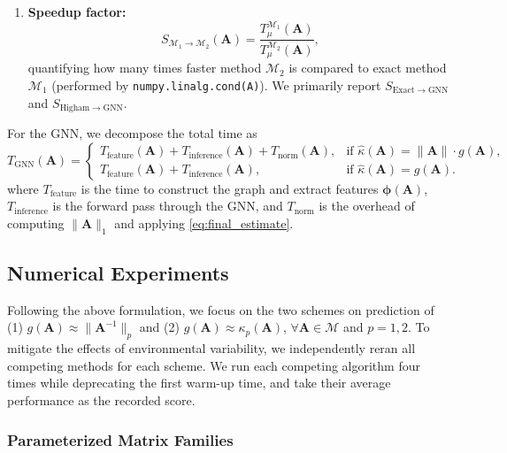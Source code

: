 \documentclass[11pt,a4paper]{article}
\theoremstyle{plain}
\theoremstyle{definition}
\theoremstyle{remark}
\begin{document}
\begin{itemize}
\begin{enumerate}
\item \textbf{Speedup factor:}
\begin{equation}
S_{\mathcal{M}_1 \to \mathcal{M}_2}(\mathbf{A}) = \frac{T_{\mu}^{\mathcal{M}_1}(\mathbf{A})}{T_{\mu}^{\mathcal{M}_2}(\mathbf{A})},
\label{eq:speedup}
\end{equation}
quantifying how many times faster method $\mathcal{M}_2$ is compared to exact method $\mathcal{M}_1$ (performed by \texttt{numpy.linalg.cond(A)}). We primarily report $S_{\mathrm{Exact} \to \mathrm{GNN}}$ and $S_{\mathrm{Higham} \to \mathrm{GNN}}$. 
\end{enumerate}

For the GNN, we decompose the total time as
\begin{equation*}
T_{\mathrm{GNN}}(\mathbf{A}) =
\begin{cases}
T_{\mathrm{feature}}(\mathbf{A}) + T_{\mathrm{inference}}(\mathbf{A}) + T_{\mathrm{norm}}(\mathbf{A}), & \text{if } \hat{\kappa}(\mathbf{A}) = \|\mathbf{A}\| \cdot g(\mathbf{A}), \\
T_{\mathrm{feature}}(\mathbf{A}) + T_{\mathrm{inference}}(\mathbf{A}), & \text{if } \hat{\kappa}(\mathbf{A}) = g(\mathbf{A}).
\end{cases}
\end{equation*}
where $T_{\mathrm{feature}}$ is the time to construct the graph and extract features $\bm{\phi}(\mathbf{A})$, $T_{\mathrm{inference}}$ is the forward pass through the GNN, and $T_{\mathrm{norm}}$ is the overhead of computing $\|\mathbf{A}\|_1$ and applying \eqref{eq:final_estimate}. 
\end{itemize}



\subsection{Numerical Experiments}

Following the above formulation, we focus on the two schemes on prediction of (1) $g(\mathbf{A}) \approx \|\mathbf{A}^{-1}\|_p$ and (2) $g(\mathbf{A}) \approx \kappa_p(\mathbf{A})$, $\forall \mathbf{A} \in \mathcal{M}$ and $p=1, 2$. To mitigate the effects of environmental variability, we independently reran all competing methods for each scheme. We run each competing algorithm four times while deprecating the first warm-up time, and take their average performance as the recorded score. 


\subsubsection{Parameterized Matrix Families}
\end{document}
